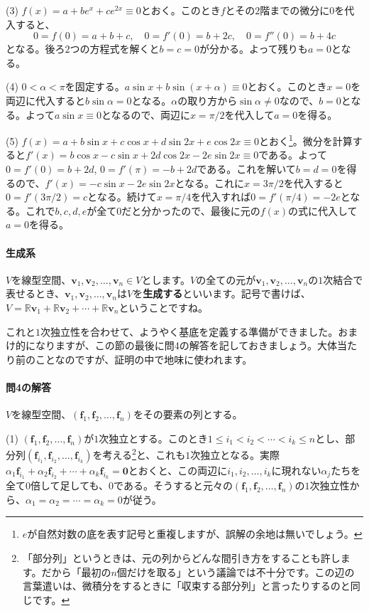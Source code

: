 \noindent (3) $f(x) = a + be^x + ce^{2x} \equiv 0$とおく。このとき$f$とその$2$階までの微分に$0$を代入すると、
\[
0 = f(0) = a + b + c,\quad 0 = f'(0) = b + 2c,\quad 0 = f''(0) = b + 4c
\]
となる。後ろ$2$つの方程式を解くと$b = c = 0$が分かる。よって残りも$a = 0$となる。

\noindent (4) $0 < \alpha < \pi$を固定する。$a \sin x + b \sin(x + \alpha) \equiv 0$とおく。このとき$x = 0$を両辺に代入すると$b\sin\alpha = 0$となる。$\alpha$の取り方から$\sin\alpha\neq 0$なので、$b = 0$となる。よって$a\sin x \equiv 0$となるので、両辺に$x = \pi/2$を代入して$a = 0$を得る。

\noindent (5) $f(x) = a + b\sin x + c \cos x + d\sin 2x + e\cos 2x \equiv 0$とおく\footnote{$e$が自然対数の底を表す記号と重複しますが、誤解の余地は無いでしょう。}。微分を計算すると$f'(x) = b\cos x - c\sin x + 2d\cos 2x -2e\sin 2x \equiv 0$である。よって$0 = f'(0) = b + 2d$, $0  = f'(\pi) = -b + 2d$である。これを解いて$b = d = 0$を得るので、$f'(x) = -c\sin x - 2e\sin 2x$となる。これに$x = 3\pi/2$を代入すると$0 = f'(3\pi/2) = c$となる。続けて$x = \pi/4$を代入すれば$0 = f'(\pi/4) = -2e$となる。これで$b, c, d, e$が全て$0$だと分かったので、最後に元の$f(x)$の式に代入して$a = 0$を得る。

\paragraph{生成系}

$V$を線型空間、$\bm{v}_1, \bm{v}_2, \ldots, \bm{v}_n\in V$とします。$V$の全ての元が$\bm{v}_1, \bm{v}_2, \ldots, \bm{v}_n$の$1$次結合で表せるとき、$\bm{v}_1, \bm{v}_2, \ldots, \bm{v}_n$は$V$を\textbf{生成する}といいます。記号で書けば、$V = \mathbb{R}\bm{v}_1 + \mathbb{R}\bm{v}_2 + \cdots + \mathbb{R}\bm{v}_n$ということですね。

これと$1$次独立性を合わせて、ようやく基底を定義する準備ができました。おまけ的になりますが、この節の最後に問4の解答を記しておきましょう。大体当たり前のことなのですが、証明の中で地味に使われます。

\paragraph{問4の解答}

$V$を線型空間、$(\bm{f}_1, \bm{f}_2, \ldots, \bm{f}_n)$をその要素の列とする。

\noindent (1) $(\bm{f}_1, \bm{f}_2, \ldots, \bm{f}_n)$が$1$次独立とする。このとき$1\leq i_1 < i_2 < \cdots < i_k \leq n$とし、部分列$(\bm{f}_{i_1}, \bm{f}_{i_2}, \ldots, \bm{f}_{i_k})$を考える\footnote{「部分列」というときは、元の列からどんな間引き方をすることも許します。だから「最初の$n$個だけを取る」という議論では不十分です。この辺の言葉遣いは、微積分をするときに「収束する部分列」と言ったりするのと同じです。}と、これも$1$次独立となる。実際$\alpha_1 \bm{f}_{i_1} + \alpha_2 \bm{f}_{i_2} + \cdots  + \alpha_k \bm{f}_{i_k} = \bm{0}$とおくと、この両辺に$i_1, i_2, \ldots, i_k$に現れない$\alpha_j$たちを全て$0$倍して足しても、$0$である。そうすると元々の$(\bm{f}_1, \bm{f}_2, \ldots, \bm{f}_n)$の$1$次独立性から、$\alpha_1 = \alpha_2 = \cdots = \alpha_k = 0$が従う。

